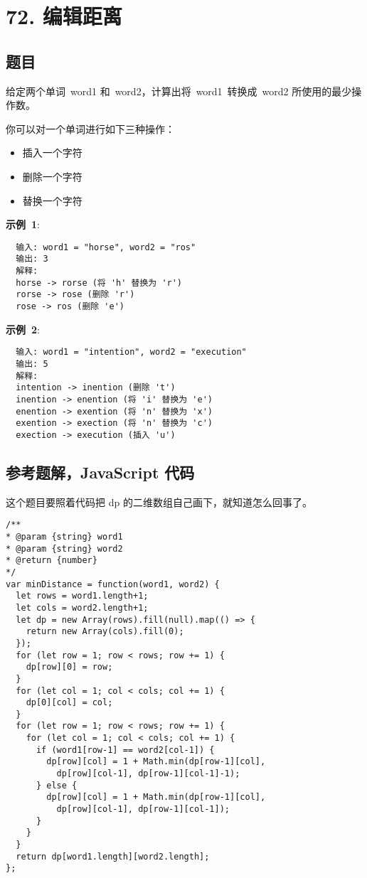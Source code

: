 \newpage
\section{72. 编辑距离}
\label{leetcode:72}

\subsection{题目}

给定两个单词 word1 和 word2，计算出将 word1 转换成 word2 所使用的最少操作数。

你可以对一个单词进行如下三种操作：

\begin{itemize}
  \item 插入一个字符
  \item 删除一个字符
  \item 替换一个字符
\end{itemize}

\textbf{示例 1}:

\begin{verbatim}
  输入: word1 = "horse", word2 = "ros"
  输出: 3
  解释:
  horse -> rorse (将 'h' 替换为 'r')
  rorse -> rose (删除 'r')
  rose -> ros (删除 'e')
\end{verbatim}

\textbf{示例 2}:

\begin{verbatim}
  输入: word1 = "intention", word2 = "execution"
  输出: 5
  解释:
  intention -> inention (删除 't')
  inention -> enention (将 'i' 替换为 'e')
  enention -> exention (将 'n' 替换为 'x')
  exention -> exection (将 'n' 替换为 'c')
  exection -> execution (插入 'u')
\end{verbatim}

\subsection{参考题解，JavaScript 代码}

这个题目要照着代码把 dp 的二维数组自己画下，就知道怎么回事了。

\begin{verbatim}
/**
* @param {string} word1
* @param {string} word2
* @return {number}
*/
var minDistance = function(word1, word2) {
  let rows = word1.length+1;
  let cols = word2.length+1;
  let dp = new Array(rows).fill(null).map(() => {
    return new Array(cols).fill(0);
  });
  for (let row = 1; row < rows; row += 1) {
    dp[row][0] = row;
  }
  for (let col = 1; col < cols; col += 1) {
    dp[0][col] = col;
  }
  for (let row = 1; row < rows; row += 1) {
    for (let col = 1; col < cols; col += 1) {
      if (word1[row-1] == word2[col-1]) {
        dp[row][col] = 1 + Math.min(dp[row-1][col],
          dp[row][col-1], dp[row-1][col-1]-1);
      } else {
        dp[row][col] = 1 + Math.min(dp[row-1][col],
          dp[row][col-1], dp[row-1][col-1]);
      }
    }
  }
  return dp[word1.length][word2.length];
};
\end{verbatim}

